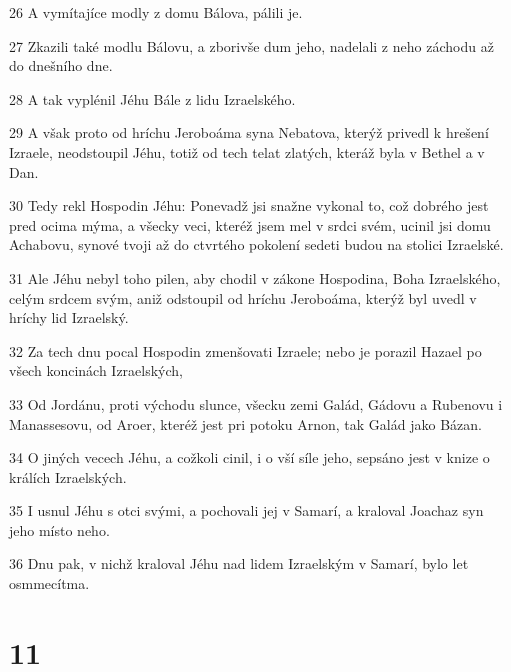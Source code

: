 \par 26 A vymítajíce modly z domu Bálova, pálili je.
\par 27 Zkazili také modlu Bálovu, a zborivše dum jeho, nadelali z neho záchodu až do dnešního dne.
\par 28 A tak vyplénil Jéhu Bále z lidu Izraelského.
\par 29 A však proto od hríchu Jeroboáma syna Nebatova, kterýž privedl k hrešení Izraele, neodstoupil Jéhu, totiž od tech telat zlatých, kteráž byla v Bethel a v Dan.
\par 30 Tedy rekl Hospodin Jéhu: Ponevadž jsi snažne vykonal to, což dobrého jest pred ocima mýma, a všecky veci, kteréž jsem mel v srdci svém, ucinil jsi domu Achabovu, synové tvoji až do ctvrtého pokolení sedeti budou na stolici Izraelské.
\par 31 Ale Jéhu nebyl toho pilen, aby chodil v zákone Hospodina, Boha Izraelského, celým srdcem svým, aniž odstoupil od hríchu Jeroboáma, kterýž byl uvedl v hríchy lid Izraelský.
\par 32 Za tech dnu pocal Hospodin zmenšovati Izraele; nebo je porazil Hazael po všech koncinách Izraelských,
\par 33 Od Jordánu, proti východu slunce, všecku zemi Galád, Gádovu a Rubenovu i Manassesovu, od Aroer, kteréž jest pri potoku Arnon, tak Galád jako Bázan.
\par 34 O jiných vecech Jéhu, a cožkoli cinil, i o vší síle jeho, sepsáno jest v knize o králích Izraelských.
\par 35 I usnul Jéhu s otci svými, a pochovali jej v Samarí, a kraloval Joachaz syn jeho místo neho.
\par 36 Dnu pak, v nichž kraloval Jéhu nad lidem Izraelským v Samarí, bylo let osmmecítma.

\chapter{11}

